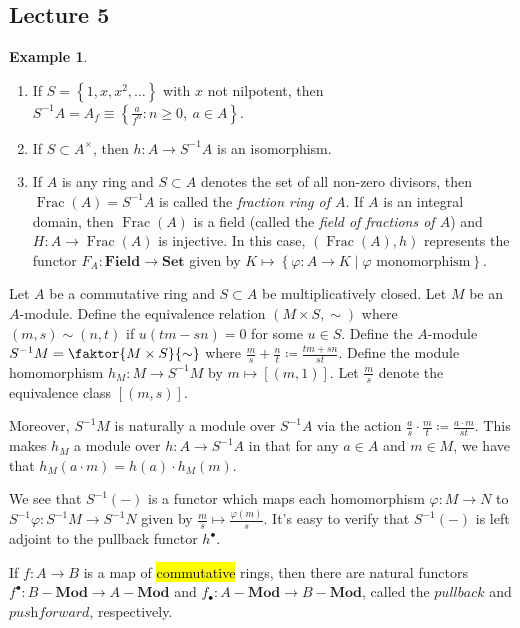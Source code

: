 \documentclass[10pt,letterpaper,cm]{nupset}
\theoremstyle{definition}
\newtheorem{exmp}[definition]{Example}
\theoremstyle{theorem}
\theoremstyle{remark}
\newcommand{\1}{\mathbf{1}}
\newcommand{\0}{\vec 0}
\DeclareMathOperator{\Frac}{Frac}
\begin{document}
\subsection{Lecture 5}

\begin{exmp} $ $
\begin{enumerate}
\item If  $S = \left\{1, x, x^2, \ldots \right\}$ with $x$ not nilpotent, then $S^{-1}A = A_f \equiv \left\{\frac{a}{f^n} : n\geq 0, \ a \in A\right\} $.
\item If $S \subset A^{\times}$, then $h: A \to S^{-1}A$ is an isomorphism. 
\item If $A$ is any ring and $S\subset A$ denotes the set of all non-zero divisors, then $\Frac(A) = S^{-1}A$ is called the \textit{fraction ring of $A$}. If $A$ is an integral domain, then $\Frac(A)$ is a field (called the \textit{field of fractions of $A$}) and $H : A \to \Frac(A)$ is injective. In this case, $(\Frac(A), h)$ represents the functor $F_A : \mathbf{Field} \to \mathbf{Set}$ given by $K \mapsto \left\{\varphi: A \to K \mid \varphi \text{ monomorphism}\right\}$. 
\end{enumerate}
\end{exmp}

\medskip

Let $A$ be a commutative ring and $S \subset A$ be multiplicatively closed. Let $M$ be an $A$-module. Define the equivalence relation $(M \times S, \sim)$ where $(m, s) \sim (n, t)$ if $u(tm - sn) = 0$ for some $u\in S$. Define the $A$-module $S^{-1}M = \faktor{M \times S}{\sim}$ where $\frac{m}{s} + \frac{n}{t} \coloneqq  \frac{tm + sn}{st}$. Define the module homomorphism $h_M : M \to S^{-1}M$ by $m \mapsto \left[(m,1)\right]$.  Let $\frac{m}{s}$ denote the equivalence class $\left[(m,s)\right]$.

Moreover, $S^{-1}M$ is naturally a module over $S^{-1}A$ via the action $\frac{a}{s} \cdot \frac{m}{t} \coloneqq  \frac{a\cdot m}{st}$. This makes $h_M$ a module over $h: A \to S^{-1}A$ in  that for any $a\in A$ and $m\in M$, we have that $h_M(a\cdot m) = h(a) \cdot h_M(m)$.

We see that $S^{-1}(-)$ is a functor which maps each homomorphism $\varphi : M \to N$ to $S^{-1}\varphi : S^{-1}M \to S^{-1}N$ given by $\frac{m}{s} \mapsto \frac{\varphi(m)}{s}$.  It's easy to verify that $S^{-1}(-)$ is left adjoint to the pullback functor $h^{\bullet}$.

\medskip


If $f: A \to B$ is a map of \hl{commutative} rings, then there are natural functors $f^{\bullet}: B{-}\mathbf{Mod} \to A{-}\mathbf{Mod}$ and $f_{\bullet} : A{-} \mathbf{Mod} \to B{-} \mathbf{Mod}$, called the $\textit{pullback}$ and $\textit{pushforward}$, respectively. 
\end{document}
